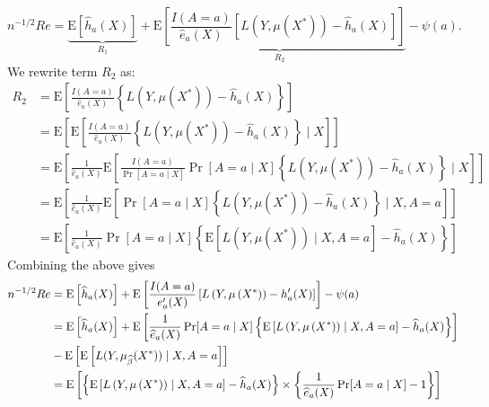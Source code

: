 $$
n^{-1 / 2} Re=
\underbrace{\mathrm{E}\left[\widehat{h}_a(X)\right]}_{R_1}+\underbrace{\mathrm{E}\left[\frac{I(A = a)}{\widehat{e}_a(X)}\left[L\left(Y, \mu\left(X^*\right)\right)-\widehat{h}_a(X)\right]\right]}_{R_2}-\psi(a).
$$
We rewrite term $R_2$ as:
$$
\begin{aligned}
R_2 & =\mathrm{E}\left[\frac{ I(A=a)}{\widehat{e}_a(X)}\left\{L\left(Y, \mu\left(X^*\right)\right)-\widehat{h}_a(X)\right\}\right] \\
& =\mathrm{E}\left[\mathrm{E}\left[\frac{ I(A=a)}{\widehat{e}_a(X)}\left\{L\left(Y, \mu\left(X^*\right)\right)-\widehat{h}_a(X)\right\} \mid X\right]\right] \\
& =\mathrm{E}\left[\frac{1}{\widehat{e}_a(X)} \mathrm{E}\left[\frac{I(A=a)}{\operatorname{Pr}[A=a \mid X]} \operatorname{Pr}[A=a \mid X]\left\{L\left(Y, \mu\left(X^*\right)\right)-\widehat{h}_a(X)\right\} \mid X\right]\right] \\
& =\mathrm{E}\left[\frac{1}{\widehat{e}_a(X)} \mathrm{E}\left[\operatorname{Pr}[A=a \mid X]\left\{L\left(Y, \mu\left(X^*\right)\right)-\widehat{h}_a(X)\right\} \mid X, A=a\right]\right] \\
& =\mathrm{E}\left[\frac{1}{\widehat{e}_a(X)} \operatorname{Pr}[A=a \mid X]\left\{\mathrm{E}\left[L\left(Y, \mu\left(X^*\right)\right) \mid X, A=a\right]-\widehat{h}_a(X)\right\}\right]
\end{aligned}
$$
Combining the above gives
$$
\begin{aligned}
n^{-1 / 2} R e & =\mathrm{E}\left[\widehat{h}_a(X)\right]+\mathrm{E}\left[\frac{I(A = a)}{e_a^{\prime}(X)}\left[L\left(Y, \mu\left(X^*\right)\right)-h_a^{\prime}(X)\right]\right]-\psi(a) \\
& =\mathrm{E}\left[\widehat{h}_a(X)\right]+\mathrm{E}\left[\frac{1}{\widehat{e}_a(X)} \operatorname{Pr}[A=a \mid X]\left\{\mathrm{E}\left[L\left(Y, \mu\left(X^*\right)\right) \mid X, A=a\right]-\widehat{h}_a(X)\right\}\right] \\ 
&- \operatorname{E}\left[\operatorname{E}\left[L(Y, \mu_{\widehat{\beta}}(X^*))\mid X, A = a\right]\right]\\
& =\operatorname{E}\left[\left\{\mathrm{E}\left[L\left(Y, \mu\left(X^*\right)\right) \mid X, A=a\right]-\widehat{h}_a(X)\right\}\times\left\{\frac{1}{\widehat{e}_a(X)} \operatorname{Pr}[A=a \mid X]-1\right\}\right]
\end{aligned}
$$
